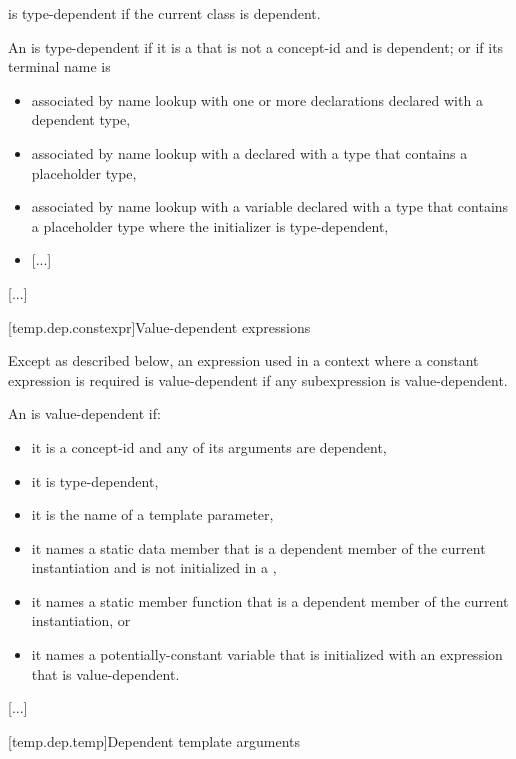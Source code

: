 \documentclass{wg21}
\begin{document}
\pnum
{}
is type-dependent if the current class is
dependent.

\pnum
An  is type-dependent
if it is a  that is not a concept-id and is dependent;
or if its terminal name is
\begin{itemize}
\item
associated by name lookup with one or more declarations
declared with a dependent type,
\item
associated by name lookup with
a  
declared with a type
that contains a placeholder type,
\item
associated by name lookup with
a variable declared with a type that contains a placeholder type
where the initializer is type-dependent,
\item \textcolor{noteclr}{[...]}
\end{itemize}

\textcolor{noteclr}{[...]}

[temp.dep.constexpr]{Value-dependent expressions}

\pnum
Except as described below, an expression used in a context where a
constant expression is required is value-dependent if any
subexpression is value-dependent.

\pnum
An
is value-dependent if:
\begin{itemize}
    \item
    it is a concept-id and any of its arguments are dependent,
    \item
    it is type-dependent,
    \item
    it is the name of a  template parameter,
    \item
    it names a static data member that is a dependent member of the current
    instantiation and is not initialized in a ,
    \item
    it names a static member function that is a dependent member of the current
    instantiation, or
    \item
    it names a potentially-constant variable 
    that is initialized with an expression that is value-dependent.
\end{itemize}

\textcolor{noteclr}{[...]}

[temp.dep.temp]{Dependent template arguments}
\end{document}
